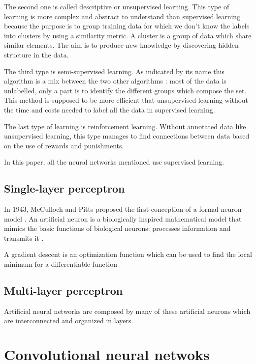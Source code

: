 The second one is called descriptive or unsupervised learning. This type of learning is more complex and abstract to understand than supervised learning because the purpose is to group training data for which we don't know the labels into clusters by using a similarity metric. 
A cluster is a group of data which share similar elements.
The aim is to produce new knowledge by discovering hidden structure in the data.

The third type is semi-supervised learning. As indicated by its name this algorithm is a mix between the two other algorithms : most of the data is unlabelled, only a part is to identify the different groups which compose the set. This method is supposed to be more efficient that unsupervised learning without the time and costs needed to label all the data in supervised learning.

The last type of learning is reinforcement learning. Without annotated data like unsupervised learning, this type manages to find connections between data based on the use of rewards and punishments.

In this paper, all the neural networks mentioned use supervised learning.



\subsection{Single-layer perceptron}



In 1943, McCulloch and Pitts proposed the first conception of a formal neuron model \cite{mcculloch}. An artificial neuron is a biologically inspired mathematical model that mimics the basic functions of biological neurons: processes information and transmits it \cite{neuron}. 








 A gradient descent is an optimization function which can be used to find the local minimum for a differentiable function


\subsection{Multi-layer perceptron}

Artificial neural networks are composed by many of these artificial neurons which are interconnected and organized in layers. 

\section{Convolutional neural netwoks}
